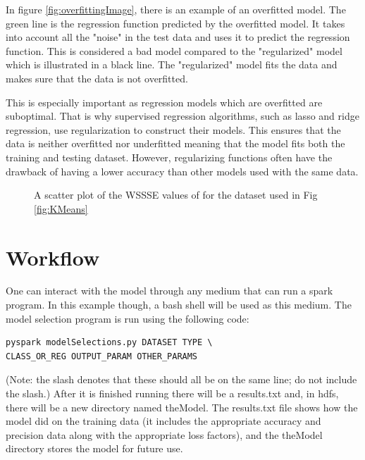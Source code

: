 \documentclass[9pt,twocolumn,twoside]{idsi}
\begin{document}
In figure \ref{fig:overfittingImage}, there is an example of an overfitted model. The green line is the regression function predicted by the overfitted model. It takes into account all the "noise" in the test data and uses it to predict the regression function.  This is considered a bad model compared to the "regularized" model which is illustrated in a black line. The "regularized" model fits the data and makes sure that the data is not overfitted. 

This is especially important as regression models which are overfitted are suboptimal. That is why supervised regression algorithms, such as lasso and ridge regression, use regularization to construct their models. This ensures that the data is neither overfitted nor underfitted meaning that the model fits both the training and testing dataset. However, regularizing functions often have the drawback of having a lower accuracy than other models used with the same data.%

\begin{figure}[h!tbp]
\centering
{}
\caption{A scatter plot of the WSSSE values of for the dataset used in Fig \ref{fig:KMeans}}
\label{fig:WSSSE}
\end{figure}

\section{Workflow}
One can interact with the model through any medium that can run a spark program. In this example though, a bash shell will be used as this medium. The model selection program is run using the following code:
\begin{lstlisting}
pyspark modelSelections.py DATASET TYPE \
CLASS_OR_REG OUTPUT_PARAM OTHER_PARAMS
\end{lstlisting}
(Note: the slash denotes that these should all be on the same line; do not include the slash.)
After it is finished running there will be a results.txt and, in hdfs, there will be a new directory named theModel. The results.txt file shows how the model did on the training data (it includes the appropriate accuracy and precision data along with the appropriate loss factors), and the theModel directory stores the model for future use.
\end{document}
